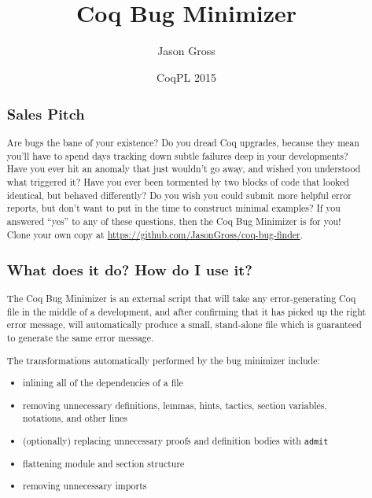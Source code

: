 \documentclass{article}
\title{Coq Bug Minimizer}
\author{Jason Gross}
\date{CoqPL 2015}
\begin{document}
\maketitle
\begin{abstract}
\subsection*{Sales Pitch}
Are bugs the bane of your existence?  Do you dread Coq upgrades, because they mean you'll have to spend days tracking down subtle failures deep in your developments?  Have you ever hit an anomaly that just wouldn't go away, and wished you understood what triggered it?  Have you ever been tormented by two blocks of code that looked identical, but behaved differently?  Do you wish you could submit more helpful error reports, but don't want to put in the time to construct minimal examples?  If you answered ``yes'' to any of these questions, then the Coq Bug Minimizer is for you!  Clone your own copy at \url{https://github.com/JasonGross/coq-bug-finder}.

\subsection*{What does it do?  How do I use it?}
The Coq Bug Minimizer is an external script that will take any error-generating Coq file in the middle of a development, and after confirming that it has picked up the right error message, will automatically produce a small, stand-alone file which is guaranteed to generate the same error message.

The transformations automatically performed by the bug minimizer include:
\begin{itemize}
    \item inlining all of the dependencies of a file
    \item removing unnecessary definitions, lemmas, hints, tactics, section variables, notations, and other lines
    \item (optionally) replacing unnecessary proofs and definition bodies with \texttt{admit}
    \item flattening module and section structure
    \item removing unnecessary imports
\end{itemize}


\end{abstract}
\end{document}

